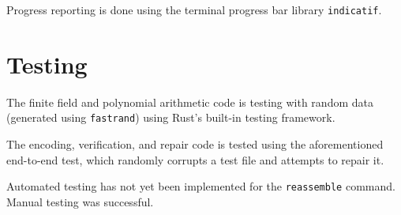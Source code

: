 Progress reporting is done using the terminal progress bar library \texttt{indicatif}.

\section{Testing}

The finite field and polynomial arithmetic code is testing with random data (generated using \texttt{fastrand}) using Rust's built-in testing framework.

The encoding, verification, and repair code is tested using the aforementioned end-to-end test, which randomly corrupts a test file and attempts to repair it.

Automated testing has not yet been implemented for the \texttt{reassemble} command. Manual testing was successful.
